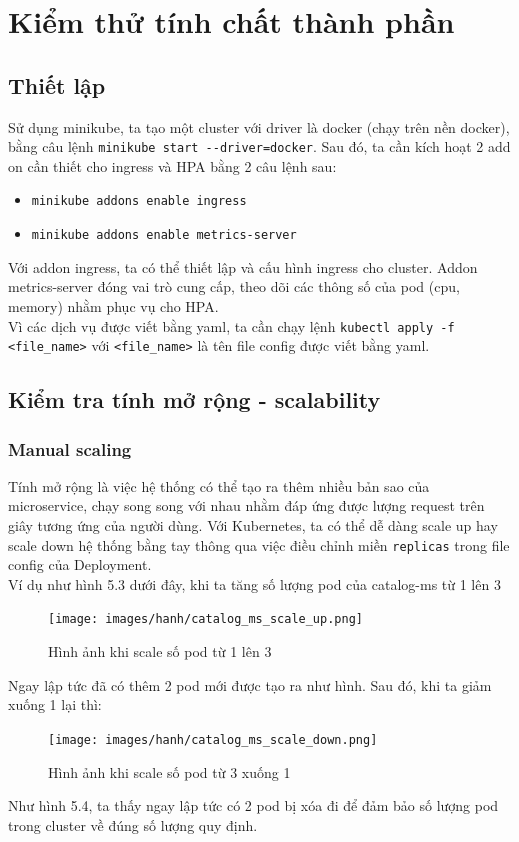 \section{Kiểm thử tính chất thành phần}
\subsection{Thiết lập}
\noindent Sử dụng minikube, ta tạo một cluster với driver là docker (chạy trên nền docker), bằng câu lệnh \lstinline|minikube start --driver=docker|. Sau đó, ta cần kích hoạt 2 add on cần thiết cho ingress và HPA bằng 2 câu lệnh sau:
\begin{itemize}
  \item \lstinline|minikube addons enable ingress|
  \item \lstinline|minikube addons enable metrics-server|
\end{itemize}
Với addon ingress, ta có thể thiết lập và cấu hình ingress cho cluster. Addon metrics-server đóng vai trò cung cấp, theo dõi các thông số của pod (cpu, memory) nhằm phục vụ cho HPA.\\[0.5cm]
Vì các dịch vụ được viết bằng yaml, ta cần chạy lệnh \lstinline|kubectl apply -f <file_name>| với \lstinline|<file_name>| là tên file config được viết bằng yaml.

\subsection{Kiểm tra tính mở rộng - scalability}
\subsubsection{Manual scaling}
\noindent Tính mở rộng là việc hệ thống có thể tạo ra thêm nhiều bản sao của microservice, chạy song song với nhau nhằm đáp ứng được lượng request trên giây tương ứng của người dùng. Với Kubernetes, ta có thể dễ dàng scale up hay scale down hệ thống bằng tay thông qua việc điều chỉnh miền \lstinline|replicas| trong file config của Deployment.\\[0.5cm]
Ví dụ như hình 5.3 dưới đây, khi ta tăng số lượng pod của catalog-ms từ 1 lên 3
\begin{figure}[H]
  \begin{center}
    \texttt{[image: images/hanh/catalog\_ms\_scale\_up.png]}
    \caption{Hình ảnh khi scale số pod từ 1 lên 3}
  \end{center}
\end{figure}
Ngay lập tức đã có thêm 2 pod mới được tạo ra như hình. Sau đó, khi ta giảm xuống 1 lại thì:
\begin{figure}[H]
  \begin{center}
    \texttt{[image: images/hanh/catalog\_ms\_scale\_down.png]}
    \caption{Hình ảnh khi scale số pod từ 3 xuống 1}
  \end{center}
\end{figure}
Như hình 5.4, ta thấy ngay lập tức có 2 pod bị xóa đi để đảm bảo số lượng pod trong cluster về đúng số lượng quy định.

